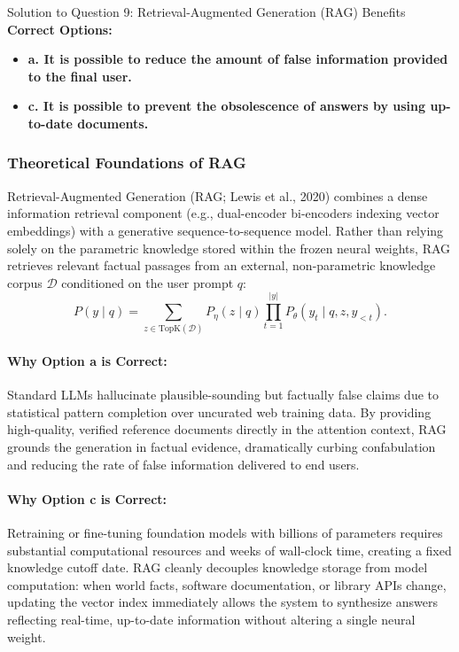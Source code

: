\documentclass[11pt,a4paper]{article}
\begin{document}
\vspace{0.4cm}

\begin{solutionbox}{Solution to Question 9: Retrieval-Augmented Generation (RAG) Benefits}
\textbf{Correct Options:}
\begin{itemize}[noitemsep]
    \item \textbf{a. It is possible to reduce the amount of false information provided to the final user.}
    \item \textbf{c. It is possible to prevent the obsolescence of answers by using up-to-date documents.}
\end{itemize}

\subsubsection*{Theoretical Foundations of RAG}
Retrieval-Augmented Generation (RAG; Lewis et al., 2020) combines a dense information retrieval component (e.g., dual-encoder bi-encoders indexing vector embeddings) with a generative sequence-to-sequence model. Rather than relying solely on the parametric knowledge stored within the frozen neural weights, RAG retrieves relevant factual passages from an external, non-parametric knowledge corpus $\mathcal{D}$ conditioned on the user prompt $q$:
\begin{equation*}
P(y \mid q) = \sum_{z \in \text{TopK}(\mathcal{D})} P_\eta(z \mid q) \prod_{t=1}^{|y|} P_\theta(y_t \mid q, z, y_{<t}).
\end{equation*}

\paragraph{Why Option a is Correct:}
Standard LLMs hallucinate plausible-sounding but factually false claims due to statistical pattern completion over uncurated web training data. By providing high-quality, verified reference documents directly in the attention context, RAG grounds the generation in factual evidence, dramatically curbing confabulation and reducing the rate of false information delivered to end users.

\paragraph{Why Option c is Correct:}
Retraining or fine-tuning foundation models with billions of parameters requires substantial computational resources and weeks of wall-clock time, creating a fixed knowledge cutoff date. RAG cleanly decouples knowledge storage from model computation: when world facts, software documentation, or library APIs change, updating the vector index immediately allows the system to synthesize answers reflecting real-time, up-to-date information without altering a single neural weight.


\end{solutionbox}
\end{document}
